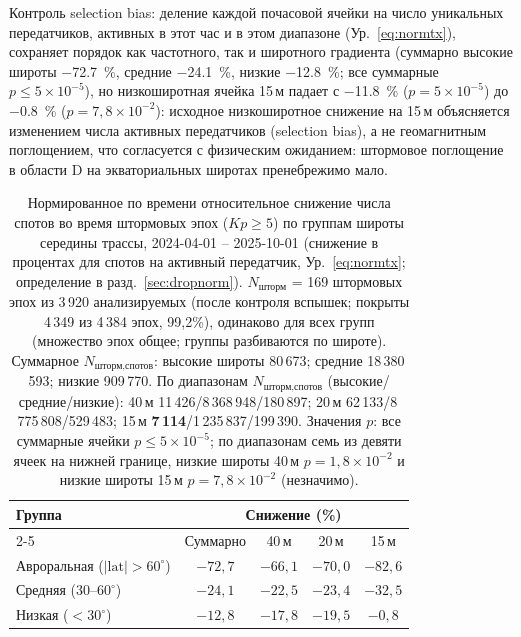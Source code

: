 \documentclass{agujournal2019}
\begin{document}
Контроль selection bias: деление каждой почасовой ячейки на число
уникальных передатчиков, активных в этот час и в этом диапазоне
(Ур.~\eqref{eq:normtx}), сохраняет порядок как частотного, так и
широтного градиента (суммарно высокие широты \SI{-72,7}{\percent}, средние
\SI{-24,1}{\percent}, низкие \SI{-12,8}{\percent}; все суммарные $p \le 5 \times 10^{-5}$),
но низкоширотная ячейка 15\,м падает с
\SI{-11,8}{\percent} ($p = 5 \times 10^{-5}$) до
\SI{-0,8}{\percent} ($p = 7{,}8 \times 10^{-2}$): исходное низкоширотное
снижение на 15\,м объясняется изменением числа активных
передатчиков (selection bias), а не геомагнитным поглощением, что
согласуется с физическим ожиданием: штормовое поглощение в области D
на экваториальных широтах пренебрежимо мало.

\begin{table}[h]
	\centering
	\small
	\caption{Нормированное по времени относительное снижение числа спотов
	во время штормовых эпох ($Kp \ge 5$) по группам широты середины трассы,
	2024-04-01 -- 2025-10-01 (снижение в процентах для спотов на активный передатчик,
	Ур.~\eqref{eq:normtx}; определение в разд.~\ref{sec:dropnorm}). $N_{\mbox{шторм}}$ = 169 штормовых эпох из
	3\,920 анализируемых (после контроля вспышек; покрыты 4\,349 из
	4\,384 эпох, 99,2\%), одинаково для всех групп (множество эпох
	общее; группы разбиваются по широте). Суммарное $N_{\mbox{шторм,спотов}}$: высокие широты
	80\,673; средние 18\,380\,593; низкие 909\,770. По диапазонам
	$N_{\mbox{шторм,спотов}}$ (высокие/средние/низкие): 40\,м
	11\,426/8\,368\,948/180\,897; 20\,м 62\,133/8\,775\,808/529\,483;
	15\,м \textbf{7\,114}/1\,235\,837/199\,390. Значения $p$: все суммарные ячейки $p \le 5 \times 10^{-5}$; по
	диапазонам семь из девяти ячеек на нижней границе, низкие широты
	40\,м $p = 1{,}8 \times 10^{-2}$ и низкие широты 15\,м
	$p = 7{,}8 \times 10^{-2}$ (незначимо).}
	\label{tab:spatial}
	\begin{tabular}{lcccc}
		\toprule
		Группа & \multicolumn{4}{c}{Снижение (\%)} \\
		\cmidrule(lr){2-5}
		 & Суммарно & 40\,м & 20\,м & 15\,м \\
		\midrule
		Авроральная ($|\mathrm{lat}| > 60^\circ$) & $-72{,}7$ & $-66{,}1$ & $-70{,}0$ & $-82{,}6$ \\
		Средняя ($30$--$60^\circ$) & $-24{,}1$ & $-22{,}5$ & $-23{,}4$ & $-32{,}5$ \\
		Низкая ($< 30^\circ$) & $-12{,}8$ & $-17{,}8$ & $-19{,}5$ & $-0{,}8$ \\
		\bottomrule
	\end{tabular}
\end{table}
\end{document}

